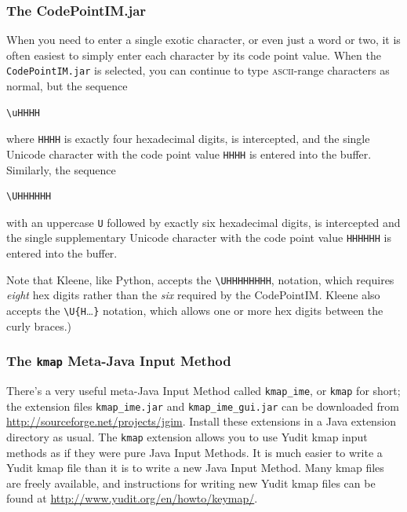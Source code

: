 \documentclass[letterpaper,12pt]{article}
\newcommand{\acro}{\textsc}
\begin{document}
\subsubsection{The CodePointIM.jar}

When you need to enter a single exotic character, or even just a word or
two, it is often easiest to simply enter each character by its code point
value.  When the \texttt{CodePointIM.jar} is selected, you can continue
to type \acro{ascii}-range characters as normal, but the sequence 

\begin{Verbatim}[fontsize=\small]
\uHHHH
\end{Verbatim}

\noindent
where
\texttt{HHHH} is exactly four hexadecimal digits, is intercepted,
and the single Unicode character with the code point
value \texttt{HHHH} is entered into the buffer.  Similarly, the sequence 

\begin{Verbatim}[fontsize=\small]
\UHHHHHH
\end{Verbatim}

\noindent
with an uppercase \texttt{U} followed by exactly six hexadecimal digits,
is intercepted and the single supplementary Unicode character with the
code point value \texttt{HHHHHH} is entered into the buffer.

Note that Kleene, like Python, accepts the \verb!\UHHHHHHHH!, notation,
which requires \emph{eight} hex digits rather than the \emph{six}
required by the CodePointIM.  Kleene also accepts the
\verb!\U{H!\ldots\verb!}! notation, which allows one or more hex digits
between the curly braces.)

\subsubsection{The \texttt{kmap} Meta-Java Input Method}

There's a very useful meta-Java Input Method called \texttt{kmap\_ime},
or \texttt{kmap} for short; the extension files \texttt{kmap\_ime.jar}
and \texttt{kmap\_ime\_gui.jar} can be downloaded from
\url{http://sourceforge.net/projects/jgim}.  Install these extensions in
a Java extension directory as usual.  The \texttt{kmap} extension allows
you to use Yudit kmap input methods as if they were pure Java Input
Methods.  It is much easier to write a Yudit kmap file than it is to
write a new Java Input Method.  Many kmap files are freely available, and
instructions for writing new Yudit kmap files can be found at
\url{http://www.yudit.org/en/howto/keymap/}.
\end{document}
